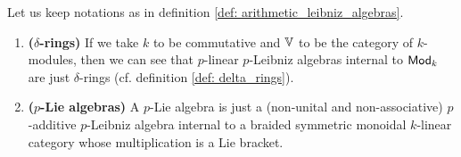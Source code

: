                     \begin{example}
                        Let us keep notations as in definition \ref{def: arithmetic_leibniz_algebras}.
                        \begin{enumerate}
                            \item \textbf{($\delta$-rings)} If we take $k$ to be commutative and $\mathbb{V}$ to be the category of $k$-modules, then we can see that $p$-linear $p$-Leibniz algebras internal to $\mathsf{Mod}_k$ are just $\delta$-rings (cf. definition \ref{def: delta_rings}).  
                            \item \textbf{($p$-Lie algebras)} A $p$-Lie algebra is just a (non-unital and non-associative) $p$-additive $p$-Leibniz algebra internal to a braided symmetric monoidal $k$-linear category whose multiplication is a Lie bracket.
                        \end{enumerate}
                    \end{example}
                    
